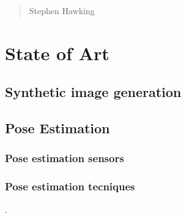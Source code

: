 \begin{quotation}
{\footnotesize
{}
\begin{flushright}
Stephen Hawking
\end{flushright}
}
\end{quotation}
\vspace{0.5cm}

\section{State of Art}

\subsection{Synthetic image generation}

\subsection{Pose Estimation}

\subsubsection{Pose estimation sensors}

\subsubsection{Pose estimation tecniques}

\cite{Dijkstra68Letters}.
